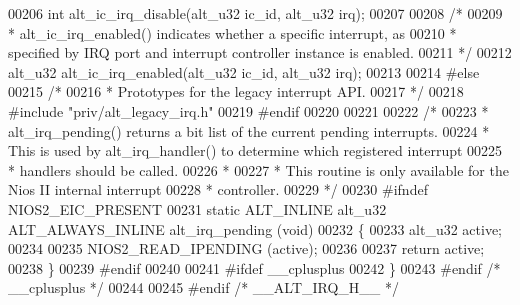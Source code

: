 \begin{DoxyCode}
00206 \textcolor{keywordtype}{int} alt\_ic\_irq\_disable(alt_u32 ic\_id, alt_u32 irq);        
00207 
00208  \textcolor{comment}{/* }
00209 \textcolor{comment}{ * alt\_ic\_irq\_enabled() indicates whether a specific interrupt, as}
00210 \textcolor{comment}{ * specified by IRQ port and interrupt controller instance is enabled.}
00211 \textcolor{comment}{ */}        
00212 alt_u32 alt\_ic\_irq\_enabled(alt_u32 ic\_id, alt_u32 irq);
00213 
00214 \textcolor{preprocessor}{#else }
00215 \textcolor{comment}{/*}
00216 \textcolor{comment}{ * Prototypes for the legacy interrupt API.}
00217 \textcolor{comment}{ */}
00218 \textcolor{preprocessor}{#include "priv/alt_legacy_irq.h"}
00219 \textcolor{preprocessor}{#endif }
00220 
00221 
00222 \textcolor{comment}{/*}
00223 \textcolor{comment}{ * alt\_irq\_pending() returns a bit list of the current pending interrupts.}
00224 \textcolor{comment}{ * This is used by alt\_irq\_handler() to determine which registered interrupt}
00225 \textcolor{comment}{ * handlers should be called.}
00226 \textcolor{comment}{ *}
00227 \textcolor{comment}{ * This routine is only available for the Nios II internal interrupt}
00228 \textcolor{comment}{ * controller.}
00229 \textcolor{comment}{ */}
00230 \textcolor{preprocessor}{#ifndef NIOS2\_EIC\_PRESENT}
00231 \textcolor{keyword}{static} ALT_INLINE alt_u32 ALT_ALWAYS_INLINE alt_irq_pending (\textcolor{keywordtype}{void})
00232 \{
00233   alt_u32 active;
00234 
00235   NIOS2_READ_IPENDING (active);
00236 
00237   \textcolor{keywordflow}{return} active;
00238 \}
00239 \textcolor{preprocessor}{#endif }
00240 
00241 \textcolor{preprocessor}{#ifdef \_\_cplusplus}
00242 \}
00243 \textcolor{preprocessor}{#endif }\textcolor{comment}{/* \_\_cplusplus */}\textcolor{preprocessor}{}
00244 
00245 \textcolor{preprocessor}{#endif }\textcolor{comment}{/* \_\_ALT\_IRQ\_H\_\_ */}\textcolor{preprocessor}{}
\end{DoxyCode}

